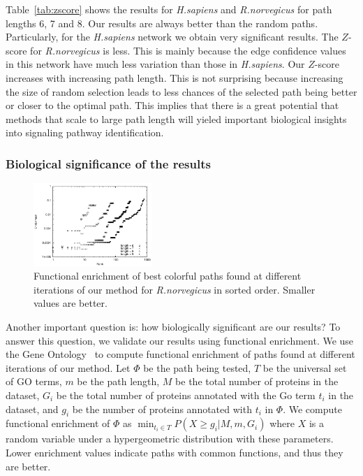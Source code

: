 \documentclass{ws-procs11x85}
\begin{document}
Table~\ref{tab:zscore} shows the results for {\it H.sapiens} and {\it
  R.norvegicus} for path lengths 6, 7 and 8. Our results are always
better than the random paths.  Particularly, for the {\it H.sapiens}
network we obtain very significant results. The $Z$-score for {\it
  R.norvegicus} is less. This is mainly because the edge confidence
values in this network have much less variation than those in {\it
  H.sapiens}.  Our $Z$-score increases with increasing path length.
This is not surprising because increasing the size of random selection
leads to less chances of the selected path being better or closer to
the optimal path.  This implies that there is a great potential that
methods that scale to large path length will yieled important
biological insights into signaling pathway identification.

\subsubsection{Biological significance of the results}


\begin{figure}
  \centering
  \vspace*{-1.5cm}
  \includegraphics[width=0.4\textwidth]{results/enrichment/enrich-rank}
  \caption{Functional enrichment of best colorful paths found at
    different iterations of our method for {\it R.norvegicus} in
    sorted order. Smaller values are better.}
  \label{fig:enrichment-rank}
\end{figure}


Another important question is: how biologically significant are our
results? To answer this question, we validate our results using
functional enrichment. We use the Gene Ontology~\cite{go} to compute
functional enrichment of paths found at different iterations of our
method. Let $\Phi$ be the path being tested, $T$ be the universal set
of GO terms, $m$ be the path length, $M$ be the total number of
proteins in the dataset, $G_i$ be the total number of proteins
annotated with the Go term $t_i$ in the dataset, and $g_i$ be the
number of proteins annotated with $t_i$ in $\Phi$. We compute
functional enrichment of $\Phi$ as $\min_{t_i \in T} P(X \geq g_i | M,
m, G_i)$ where $X$ is a random variable under a hypergeometric
distribution with these parameters. Lower enrichment values indicate
paths with common functions, and thus they are better.
\end{document}
